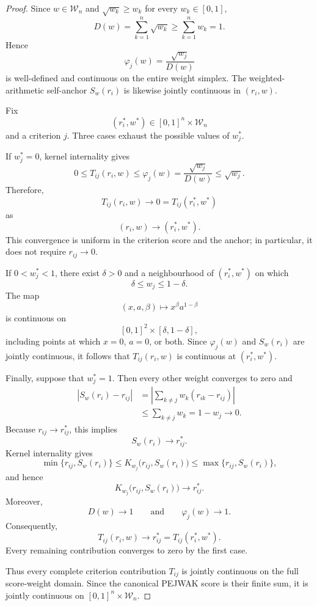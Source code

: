 \documentclass[10pt,a4paper]{amsart}
\begin{document}
\begin{proof}
Since \(w\in\mathcal W_n\) and
\(\sqrt{w_k}\geq w_k\) for every \(w_k\in[0,1]\),
\[
D(w)
=
\sum_{k=1}^{n}\sqrt{w_k}
\geq
\sum_{k=1}^{n}w_k
=
1.
\]
Hence
\[
\varphi_j(w)
=
\frac{\sqrt{w_j}}{D(w)}
\]
is well-defined and continuous on the entire weight simplex.
The weighted-arithmetic self-anchor \(S_w(r_i)\) is likewise jointly
continuous in \((r_i,w)\).

Fix
\[
(r_i^\ast,w^\ast)
\in
[0,1]^n\times\mathcal W_n
\]
and a criterion \(j\). Three cases exhaust the possible values of
\(w_j^\ast\).

If \(w_j^\ast=0\), kernel internality gives
\[
0
\leq
T_{ij}(r_i,w)
\leq
\varphi_j(w)
=
\frac{\sqrt{w_j}}{D(w)}
\leq
\sqrt{w_j}.
\]
Therefore,
\[
T_{ij}(r_i,w)
\longrightarrow
0
=
T_{ij}(r_i^\ast,w^\ast)
\]
as
\[
(r_i,w)\longrightarrow(r_i^\ast,w^\ast).
\]
This convergence is uniform in the criterion score and the anchor; in
particular, it does not require \(r_{ij}\to0\).

If \(0<w_j^\ast<1\), there exist \(\delta>0\) and a neighbourhood of
\((r_i^\ast,w^\ast)\) on which
\[
\delta
\leq
w_j
\leq
1-\delta.
\]
The map
\[
(x,a,\beta)
\longmapsto
x^\beta a^{1-\beta}
\]
is continuous on
\[
[0,1]^2\times[\delta,1-\delta],
\]
including points at which \(x=0\), \(a=0\), or both. Since
\(\varphi_j(w)\) and \(S_w(r_i)\) are jointly continuous, it follows that
\(T_{ij}(r_i,w)\) is continuous at \((r_i^\ast,w^\ast)\).

Finally, suppose that \(w_j^\ast=1\). Then every other weight converges
to zero and
\[
\begin{aligned}
\left|S_w(r_i)-r_{ij}\right|
&=
\left|
\sum_{k\neq j}w_k(r_{ik}-r_{ij})
\right| \\
&\leq
\sum_{k\neq j}w_k
=
1-w_j
\longrightarrow0.
\end{aligned}
\]
Because \(r_{ij}\to r_{ij}^\ast\), this implies
\[
S_w(r_i)\longrightarrow r_{ij}^\ast.
\]
Kernel internality gives
\[
\min\{r_{ij},S_w(r_i)\}
\leq
K_{w_j}\bigl(r_{ij},S_w(r_i)\bigr)
\leq
\max\{r_{ij},S_w(r_i)\},
\]
and hence
\[
K_{w_j}\bigl(r_{ij},S_w(r_i)\bigr)
\longrightarrow
r_{ij}^\ast.
\]
Moreover,
\[
D(w)\longrightarrow1
\qquad\text{and}\qquad
\varphi_j(w)\longrightarrow1.
\]
Consequently,
\[
T_{ij}(r_i,w)
\longrightarrow
r_{ij}^\ast
=
T_{ij}(r_i^\ast,w^\ast).
\]
Every remaining contribution converges to zero by the first case.

Thus every complete criterion contribution \(T_{ij}\) is jointly
continuous on the full score-weight domain. Since the canonical PEJWAK
score is their finite sum, it is jointly continuous on
\([0,1]^n\times\mathcal W_n\).
\end{proof}
\end{document}
